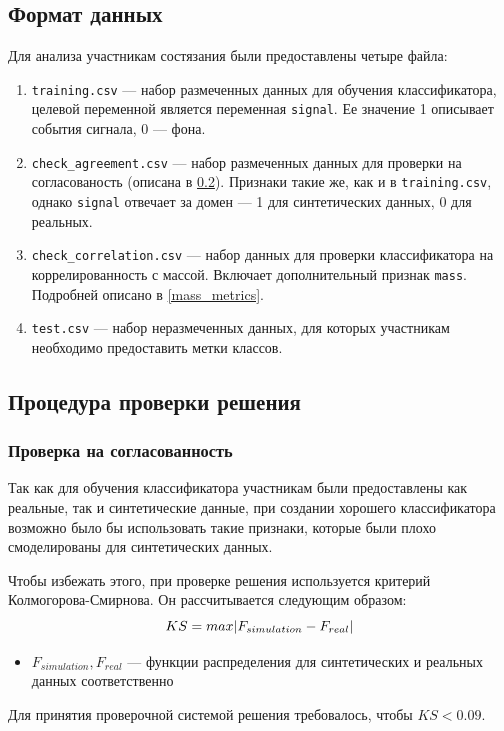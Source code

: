 \documentclass[14pt]{extarticle}
\DeclarePairedDelimiter{\abs}{\lvert}{\rvert}
\begin{document}
\subsection{Формат данных}
Для анализа участникам состязания были предоставлены четыре файла:
\begin{enumerate}
\item \texttt{training.csv} — набор размеченных данных для обучения классификатора, целевой переменной является переменная \texttt{signal}. Ее значение 1 описывает события сигнала, 0 — фона.
\item \texttt{check\_agreement.csv} — набор размеченных данных для проверки на согласованость (описана в \ref{agreement_metrics}). Признаки такие же, как и в \texttt{training.csv}, однако \texttt{signal} отвечает за домен — 1 для синтетических данных, 0 для реальных.
\item \texttt{check\_correlation.csv} — набор данных для проверки классификатора на коррелированность с массой. Включает дополнительный признак \texttt{mass}. Подробней описано в \ref{mass_metrics}.
\item \texttt{test.csv} — набор неразмеченных данных, для которых участникам необходимо предоставить метки классов.
\end{enumerate}

\subsection{Процедура проверки решения}

\label{agreement_metrics}
\subsubsection{Проверка на согласованность}
Так как для обучения классификатора участникам были предоставлены как реальные, так и синтетические данные, при создании хорошего классификатора возможно было бы использовать такие признаки, которые были плохо смоделированы для синтетических данных. 

Чтобы избежать этого, при проверке решения используется критерий Колмогорова-Смирнова. Он рассчитывается следующим образом:
\begin{equation*}
	KS = max \abs{F_{simulation} - F_{real}}
\end{equation*}
\begin{itemize}
	\item $F_{simulation}, F_{real}$ — функции распределения для синтетических и реальных данных соответственно
\end{itemize}
Для принятия проверочной системой решения требовалось, чтобы $KS < 0.09$.
\end{document}
